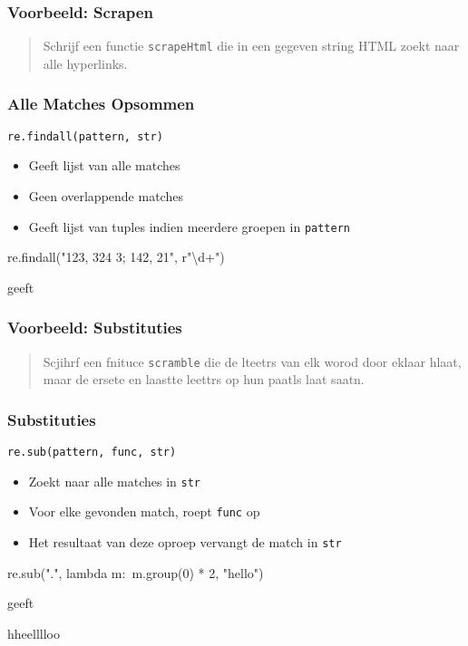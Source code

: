 \begin{frame}
  \frametitle{Voorbeeld: Scrapen}
  \begin{quote}
    Schrijf een functie \texttt{scrapeHtml} die in een gegeven string HTML
    zoekt naar alle hyperlinks.
  \end{quote}
\end{frame}

\begin{frame}
  \frametitle{Alle Matches Opsommen}
  \begin{center}
    \texttt{re.findall(pattern, str)}
  \end{center}
  \begin{itemize}
    \item Geeft lijst van alle matches
    \item Geen overlappende matches
    \item Geeft lijst van tuples indien meerdere groepen in \texttt{pattern}
  \end{itemize}
  \vskip5mm
  \begin{center} \ttfamily
    re.findall("123, 324 3; 142, 21", r"\textbackslash d+")
  \end{center}
  geeft
  \begin{center} \ttfamily
    [ "123", "324", "3", "142", "21" ]
  \end{center}
\end{frame}

\begin{frame}
  \frametitle{Voorbeeld: Substituties}
  \begin{quote}
    Scjihrf een fnituce	\texttt{scramble} die de
    lteetrs van elk worod door eklaar hlaat, maar de ersete
    en laastte leettrs op hun paatls laat saatn.
  \end{quote}
\end{frame}

\begin{frame}
  \frametitle{Substituties}
  \begin{center}
    \texttt{re.sub(pattern, func, str)}
  \end{center}
  \begin{itemize}
    \item Zoekt naar alle matches in \texttt{str}
    \item Voor elke gevonden match, roept \texttt{func} op
    \item Het resultaat van deze oproep vervangt de match in \texttt{str}
  \end{itemize}
  \vskip5mm
  \begin{center} \ttfamily
    re.sub(".", lambda m:\ m.group(0) * 2, "hello")
  \end{center}
  geeft
  \begin{center} \ttfamily
    hheelllloo
  \end{center}
\end{frame}



